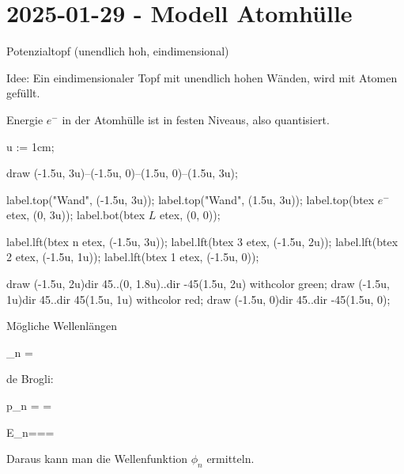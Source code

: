 \startplaceformula[reference]
\startformula

\stopformula
\stopplaceformula
\stopframedtipp

\section{2025-01-29 - Modell Atomhülle}

Potenzialtopf (unendlich hoh, eindimensional)

\startframedtipp
Idee: Ein eindimensionaler Topf mit unendlich hohen Wänden, wird mit Atomen gefüllt.
\stopframedtipp

Energie $e^-$ in der Atomhülle ist in festen Niveaus, also quantisiert.

\startMPpage

u := 1cm;

draw (-1.5u, 3u)--(-1.5u, 0)--(1.5u, 0)--(1.5u, 3u);

label.top("Wand", (-1.5u, 3u));
label.top("Wand", (1.5u, 3u));
label.top(btex $e^-$ etex, (0, 3u));
label.bot(btex $L$ etex, (0, 0));

label.lft(btex n etex, (-1.5u, 3u));
label.lft(btex 3 etex, (-1.5u, 2u));
label.lft(btex 2 etex, (-1.5u, 1u));
label.lft(btex 1 etex, (-1.5u, 0));


draw (-1.5u, 2u){dir 45}..(0, 1.8u)..{dir -45}(1.5u, 2u) withcolor green;
draw (-1.5u, 1u){dir 45}..{dir 45}(1.5u, 1u) withcolor red;
draw (-1.5u, 0){dir 45}..{dir -45}(1.5u, 0);

\stopMPpage
\stopbuffer


Mögliche Wellenlängen



\startplaceformula[2025:01:29:wellenlaengen]
\startformula
\lambda_n = 
\stopformula
\stopplaceformula

de Brogli:

\startplaceformula[2025:01:29:debrogli]
\startformula
p_n = =
\stopformula
\stopplaceformula

\startformula
E_n===\cdot {}
\stopformula

Daraus kann man die Wellenfunktion $\phi_n$ ermitteln.

